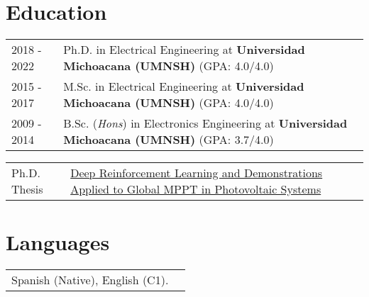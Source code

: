 \documentclass[a4paper,10pt]{article}
\begin{document}
\section{Education}
\begin{tabularx}{\linewidth}{@{}l X@{}}	
2018 - 2022 & Ph.D. in Electrical Engineering  at \textbf{Universidad Michoacana (UMNSH)} \hfill \normalsize (GPA: 4.0/4.0) \\

2015 - 2017 & M.Sc. in Electrical Engineering at \textbf{Universidad Michoacana (UMNSH)} \hfill (GPA: 4.0/4.0) \\ 

2009 - 2014 & B.Sc. (\textit{Hons}) in Electronics Engineering at \textbf{Universidad Michoacana (UMNSH)} \hfill (GPA: 3.7/4.0) \\ 
\end{tabularx}

\begin{tabularx}{\linewidth}{@{}l X@{}}		
Ph.D. Thesis & \href{https://balcortex.github.io/assets/thesis/thesis_phd.pdf}{Deep Reinforcement Learning and Demonstrations Applied to Global MPPT in Photovoltaic Systems} \hfill \\
\end{tabularx}


\section{Languages}
\begin{tabularx}{\linewidth}{@{}l X@{}}
Spanish (Native), English (C1).\\  
\end{tabularx}



\end{document}
